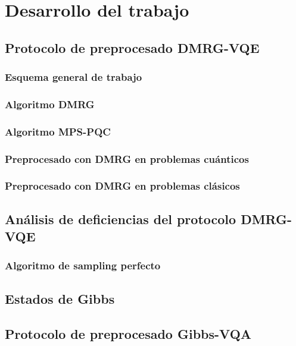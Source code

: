 \chapter{Desarrollo del trabajo}

\section{Protocolo de preprocesado DMRG-VQE}

\subsection{Esquema general de trabajo}
\subsection{Algoritmo DMRG}
\subsection{Algoritmo MPS-PQC}
\subsection{Preprocesado con DMRG en problemas cuánticos}
\subsection{Preprocesado con DMRG en problemas clásicos}

\section{Análisis de deficiencias del protocolo DMRG-VQE}
\subsection{Algoritmo de sampling perfecto}

\section{Estados de Gibbs}

\section{Protocolo de preprocesado Gibbs-VQA}

